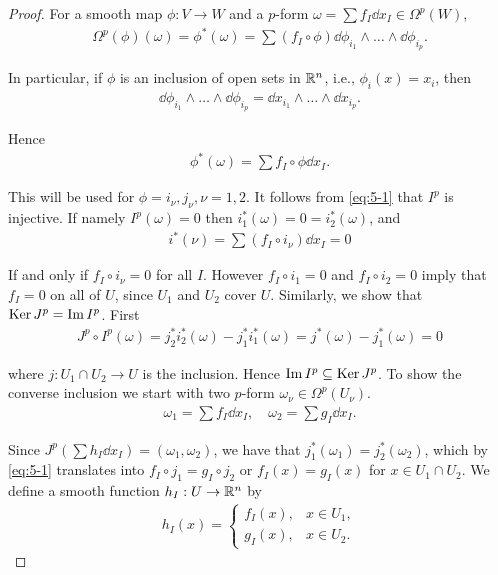 \begin{proof}
  For a smooth map $\phi:V\to W$ and a $p$-form $\omega = \sum f_I\dd x_I\in \Omega^p(W)$,
  \begin{align*}
    \Omega^p(\phi)(\omega)=\phi^*(\omega)=\sum (f_I\circ\phi)\dd\phi_{i_1}\wedge\ldots\wedge\dd\phi_{i_p}.    
  \end{align*}

  In particular, if $\phi$ is an inclusion of open sets in ${\mathbb{R}}^n$, i.e., $\phi_i(x) = x_i$, then 
  \begin{align*}
    \dd \phi_{i_1}\wedge\ldots\wedge\dd\phi_{i_p} = \dd x_{i_1}\wedge\ldots\wedge\dd x_{i_p}.  
  \end{align*}

  Hence 
  \begin{align}\label{eq:5-1}
    \phi^*(\omega) = \sum f_I\circ\phi\dd x_I.
  \end{align}

  This will be used for $\phi = i_\nu, j_\nu, \nu=1, 2$. It follows from \eqref{eq:5-1} that $I^p$ is injective.
  If namely $I^p(\omega) = 0$ then $i^*_1(\omega) = 0 = i^*_2(\omega)$, and 
  \begin{align*}
    i^*(\nu) = \sum (f_I\circ i_\nu)\dd x_I = 0
  \end{align*}

  If and only if $f_I\circ i_\nu = 0$ for all $I$. However $f_I\circ i_1 = 0$ and $f_I\circ i_2 = 0$ imply that
  $f_I = 0$ on all of $U$, since $U_1$ and $U_2$ cover $U$. Similarly, we show that $\operatorname{Ker} J^p = \operatorname{Im} I^p$. First 
  \begin{align*}
    J^p\circ I^p(\omega) 
    = j^*_2i^*_2(\omega) - j^*_1i^*_1(\omega) 
    = j^*(\omega) - j^*_1(\omega) 
    = 0
  \end{align*}

  where $j:U_1\cap U_2 \to U$ is the inclusion. Hence $\operatorname{Im} I^p \subseteq \operatorname{Ker} J^p$. To show the converse inclusion 
  we start with two $p$-form $\omega_\nu\in \Omega^p(U_\nu)$.
  \begin{align*}
    \omega_1 = \sum f_I\dd x_I, \quad \omega_2 = \sum g_I\dd x_I.
  \end{align*}

  Since $J^p(\sum h_I\dd x_I) = (\omega_1, \omega_2)$, we have that $j_1^*(\omega_1) = j^*_2(\omega_2)$, which by 
  \eqref{eq:5-1} translates into $f_I\circ j_1 = g_I\circ j_2$ or $f_I(x) = g_I(x)$ for $x\in U_1\cap U_2$. We define 
  a smooth function $h_I:U\to {\ensuremath{\mathbb{R}}}^n$ by
  \begin{align*}
    h_I(x) = \begin{cases}
      f_I(x), & x\in U_1,\\
      g_I(x), & x\in U_2.
    \end{cases}  
  \end{align*}
  

\end{proof}
